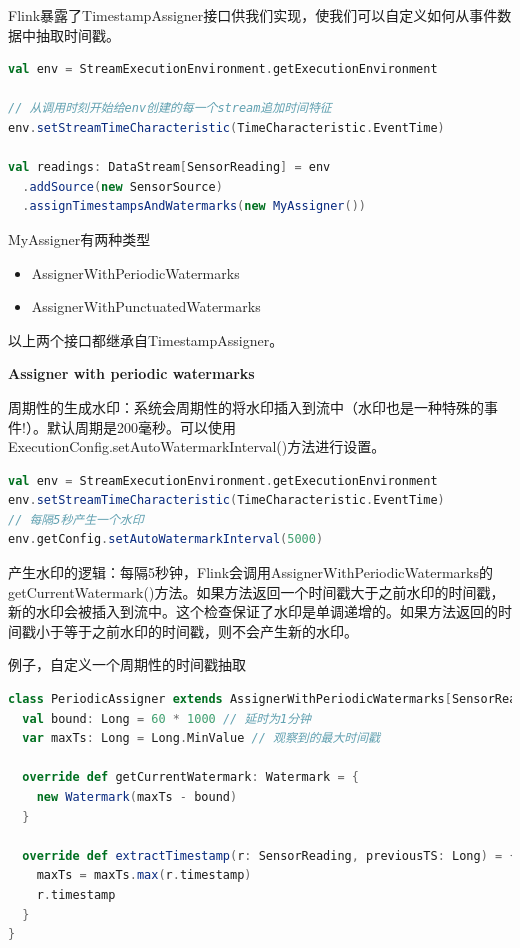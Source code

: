 \documentclass[oneside]{ctexbook}
\begin{document}
Flink暴露了TimestampAssigner接口供我们实现，使我们可以自定义如何从事件数据中抽取时间戳。

\begin{lstlisting}[language=scala]
val env = StreamExecutionEnvironment.getExecutionEnvironment
 
// 从调用时刻开始给env创建的每一个stream追加时间特征
env.setStreamTimeCharacteristic(TimeCharacteristic.EventTime)

val readings: DataStream[SensorReading] = env
  .addSource(new SensorSource)
  .assignTimestampsAndWatermarks(new MyAssigner())
\end{lstlisting}

MyAssigner有两种类型

\begin{itemize}
\item AssignerWithPeriodicWatermarks
\item AssignerWithPunctuatedWatermarks
\end{itemize}

以上两个接口都继承自TimestampAssigner。

\textbf{Assigner with periodic watermarks}

周期性的生成水印：系统会周期性的将水印插入到流中（水印也是一种特殊的事件!）。默认周期是200毫秒。可以使用ExecutionConfig.setAutoWatermarkInterval()方法进行设置。

\begin{lstlisting}[language=scala]
val env = StreamExecutionEnvironment.getExecutionEnvironment
env.setStreamTimeCharacteristic(TimeCharacteristic.EventTime)
// 每隔5秒产生一个水印
env.getConfig.setAutoWatermarkInterval(5000)
\end{lstlisting}

产生水印的逻辑：每隔5秒钟，Flink会调用AssignerWithPeriodicWatermarks的getCurrentWatermark()方法。如果方法返回一个时间戳大于之前水印的时间戳，新的水印会被插入到流中。这个检查保证了水印是单调递增的。如果方法返回的时间戳小于等于之前水印的时间戳，则不会产生新的水印。

例子，自定义一个周期性的时间戳抽取

\begin{lstlisting}[language=scala]
class PeriodicAssigner extends AssignerWithPeriodicWatermarks[SensorReading] {
  val bound: Long = 60 * 1000 // 延时为1分钟
  var maxTs: Long = Long.MinValue // 观察到的最大时间戳

  override def getCurrentWatermark: Watermark = {
    new Watermark(maxTs - bound)
  }

  override def extractTimestamp(r: SensorReading, previousTS: Long) = {
    maxTs = maxTs.max(r.timestamp)
    r.timestamp
  }
}
\end{lstlisting}
\end{document}
